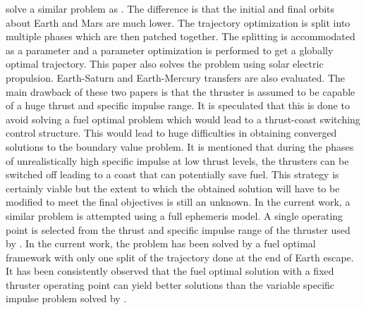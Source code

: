 \cite{genta_optimal_2016} solve a similar problem as \cite{nah_fuel-optimal_2001}. The difference is that the initial and final orbits about Earth and Mars are much lower. The trajectory optimization is split into multiple phases which are then patched together. The splitting is accommodated as a parameter and a parameter optimization is performed to get a globally optimal trajectory. This paper also solves the problem using solar electric propulsion. Earth-Saturn and Earth-Mercury transfers are also evaluated. The main drawback of these two papers is that the thruster is assumed to be capable of a huge thrust and specific impulse range. It is speculated that this is done to avoid solving a fuel optimal problem which would lead to a thrust-coast switching control structure. This would lead to huge difficulties in obtaining converged solutions to the boundary value problem. It is mentioned that during the phases of unrealistically high specific impulse at low thrust levels, the thrusters can be switched off leading to a coast that can potentially save fuel. This strategy is certainly viable but the extent to which the obtained solution will have to be modified to meet the final objectives is still an unknown. In the current work, a similar problem is attempted using a full ephemeris model. A single operating point is selected from the thrust and specific impulse range of the thruster used by \cite{genta_optimal_2016}. In the current work, the problem has been solved by a fuel optimal framework with only one split of the trajectory done at the end of Earth escape. It has been consistently observed that the fuel optimal solution with a fixed thruster operating point can yield better solutions than the variable specific impulse problem solved by \cite{genta_optimal_2016}.
